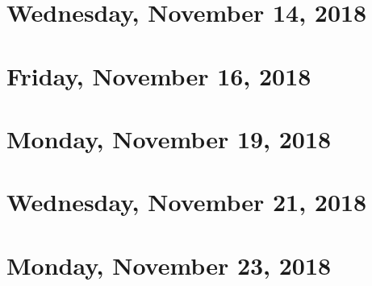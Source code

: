 \documentclass[reqno]{amsart}
\begin{document}
\section{Wednesday, November 14, 2018}
    
    
\section{Friday, November 16, 2018}
    

\section{Monday, November 19, 2018}
    
    
\section{Wednesday, November 21, 2018}
    

\section{Monday, November 23, 2018}
    
\end{document}
